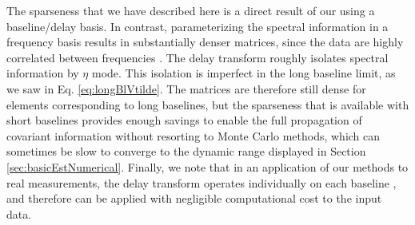\documentclass[twocolumn,aps,prd,nofootinbib,showpacs]{revtex4-1}
\begin{document}
The sparseness that we have described here is a direct result of our using a baseline/delay basis.  In contrast, parameterizing the spectral information in a frequency basis results in substantially denser matrices, since the data are highly correlated between frequencies \cite{Trott2012}.  The delay transform roughly isolates spectral information by $\eta$ mode.  This isolation is imperfect in the long baseline limit, as we saw in  Eq. \eqref{eq:longBlVtilde}.  The matrices are therefore still dense for elements corresponding to long baselines, but the sparseness that is available with short baselines provides enough savings to enable the full propagation of covariant information without resorting to Monte Carlo methods, which can sometimes be slow to converge to the dynamic range displayed in Section \ref{sec:basicEstNumerical}.  Finally, we note that in an application of our methods to real measurements, the delay transform operates individually on each baseline \cite{Parsons2012b}, and therefore can be applied with negligible computational cost to the input data.


\end{document}
